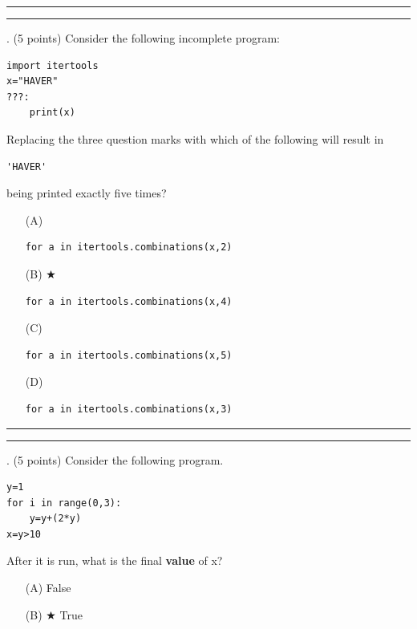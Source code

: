\documentclass{article}
\newcounter{question}
\begin{document}
\vspace*{2em}
\hrule
\vspace{2em}

\vspace{2em}
\hrule height 2pt


\newpage
{}. (5 points)
Consider the following incomplete program:
\begin{verbatim}
import itertools
x="HAVER"
???:
    print(x)
\end{verbatim}
Replacing the three question marks with which of the following will result in \begin{verbatim}'HAVER'\end{verbatim} being printed exactly five times?


\begin{enumerate}
\item[(A)]
\begin{verbatim}
for a in itertools.combinations(x,2)
\end{verbatim}

\item[(B)] $\bigstar$ 
\begin{verbatim}
for a in itertools.combinations(x,4)
\end{verbatim}

\item[(C)]
\begin{verbatim}
for a in itertools.combinations(x,5)
\end{verbatim}

\item[(D)]
\begin{verbatim}
for a in itertools.combinations(x,3)
\end{verbatim}

\end{enumerate}

\vspace*{2em}
\hrule
\vspace{2em}

\vspace{2em}
\hrule height 2pt


\newpage
{}. (5 points)
Consider the following program.
\begin{verbatim}
y=1
for i in range(0,3):
    y=y+(2*y)
x=y>10
\end{verbatim}
After it is run, what is the final \textbf{value} of x?


\begin{enumerate}
\item[(A)]
False

\item[(B)] $\bigstar$ 
True

\end{enumerate}
\end{document}
